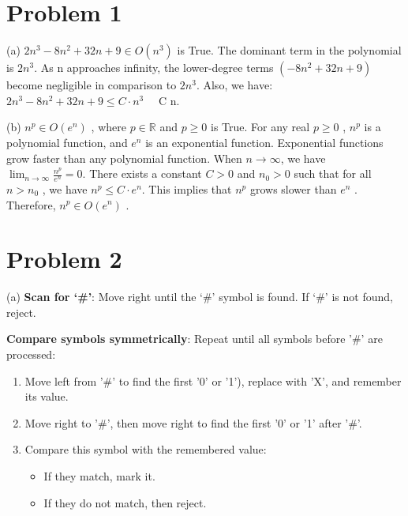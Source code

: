 \documentclass[12 pt]{article}
\begin{document}
\section*{Problem 1}

(a) $2n^3 - 8n^2 + 32n + 9 \in O(n^3)$ is True. The dominant term in the polynomial is $2n^3$. As n approaches infinity, the lower-degree terms $(-8n^2 + 32n + 9)$ become negligible in comparison to $2n^3$. Also, we have: $2n^3 - 8n^2 + 32n + 9 \leq C \cdot n^3 \quad$  C  n.


(b) $n^p \in O(e^n)$ , where  $p \in \mathbb{R}$  and  $p \geq 0$ is True. For any real  $p \geq 0$ ,  $n^p$  is a polynomial function, and  $e^n$  is an exponential function. Exponential functions grow faster than any polynomial function. When $n \to \infty$, we have $\lim_{n \to \infty} \frac{n^p}{e^n} = 0$. There exists a constant  $C > 0$  and  $n_0 > 0$  such that for all  $n > n_0$ , we have  $n^p \leq C \cdot e^n$. This implies that  $n^p$  grows slower than  $e^n$ . Therefore,  $n^p \in O(e^n)$ .







\vspace{1cm}

\section*{Problem 2}

(a) 
\textbf{Scan for ‘\#’}: Move right until the ‘\#’ symbol is found. If ‘\#’ is not found, reject.


\textbf{Compare symbols symmetrically}: Repeat until all symbols before '\#' are processed:
    \begin{enumerate}
        \item Move left from '\#' to find the first '0' or '1'), replace with 'X', and remember its value.
        \item Move right to '\#', then move right to find the first '0' or '1' after '\#'.
        \item Compare this symbol with the remembered value:
        \begin{itemize}
            \item If they match, mark it.
            \item If they do not match, then reject.
        \end{itemize}
    \end{enumerate}
\end{document}
